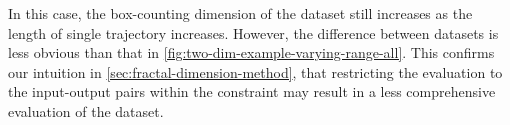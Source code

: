 In this case, the box-counting dimension of the dataset still increases as the length of single trajectory increases.
However, the difference between datasets is less obvious than that in \cref{fig:two-dim-example-varying-range-all}.
This confirms our intuition in \cref{sec:fractal-dimension-method}, that restricting the evaluation to the input-output pairs within the constraint may result in a less comprehensive evaluation of the dataset.


